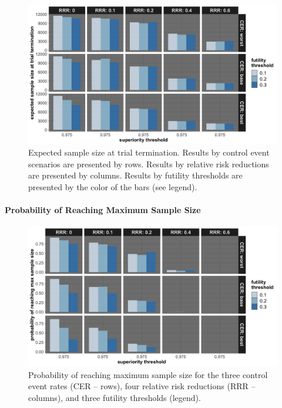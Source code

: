 \documentclass[]{article}
\let\oldparagraph\paragraph
\renewcommand{\paragraph}[1]{\oldparagraph{#1}\mbox{}}
\begin{document}
\begin{figure}
  \caption{Expected sample size at trial termination. Results by control event scenarios are presented by rows. Results
  by relative risk reductions are presented by columns. Results by futility thresholds are presented by the color of the bars (see legend).}
  \includegraphics{../p1_plots/batch_size_nb_2000/exp_sample_size_p1.png}
\end{figure}

\hypertarget{probability-of-reaching-maximum-sample-size-1}{%
\paragraph{Probability of Reaching Maximum Sample
Size}\label{probability-of-reaching-maximum-sample-size-1}}

\begin{figure}
  \caption{Probability of reaching maximum sample size for the three control event rates (CER – rows), four relative
  risk reductions (RRR – columns), and three futility thresholds (legend).}
  \includegraphics{../p1_plots/batch_size_nb_2000/prob_reach_max_size_p1.png}
\end{figure}
\end{document}
